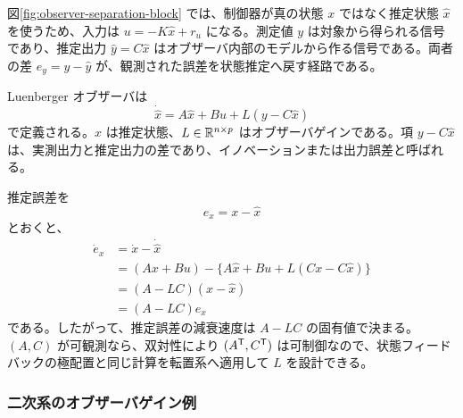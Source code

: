 図\ref{fig:observer-separation-block} では、制御器が真の状態 $x$ ではなく推定状態 $\hat{x}$ を使うため、入力は $u=-K\hat{x}+r_u$ になる。測定値 $y$ は対象から得られる信号であり、推定出力 $\hat{y}=C\hat{x}$ はオブザーバ内部のモデルから作る信号である。両者の差 $e_y=y-\hat{y}$ が、観測された誤差を状態推定へ戻す経路である。

Luenberger オブザーバは
\begin{equation}
  \dot{\hat{x}}=A\hat{x}+Bu+L(y-C\hat{x})
  \label{eq:luenberger-observer}
\end{equation}
で定義される。$\hat{x}$ は推定状態、$L\in\mathbb{R}^{n\times p}$ はオブザーバゲインである。項 $y-C\hat{x}$ は、実測出力と推定出力の差であり、イノベーションまたは出力誤差と呼ばれる。

推定誤差を
\begin{equation}
  e_x=x-\hat{x}
\end{equation}
とおくと、
\begin{align}
  \dot{e}_x
  &=\dot{x}-\dot{\hat{x}}\\
  &=(Ax+Bu)-\{A\hat{x}+Bu+L(Cx-C\hat{x})\}\\
  &=(A-LC)(x-\hat{x})\\
  &=(A-LC)e_x
  \label{eq:observer-error-dynamics}
\end{align}
である。したがって、推定誤差の減衰速度は $A-LC$ の固有値で決まる。$(A,C)$ が可観測なら、双対性により $(A^{\mathsf{T}},C^{\mathsf{T}})$ は可制御なので、状態フィードバックの極配置と同じ計算を転置系へ適用して $L$ を設計できる。

\subsubsection{二次系のオブザーバゲイン例}

